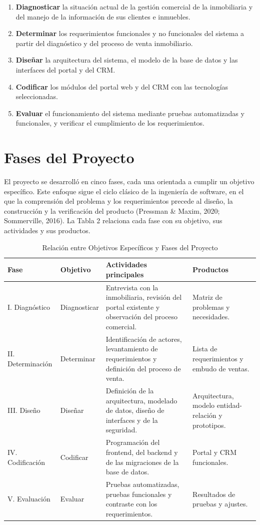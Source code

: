 \documentclass[stu,12pt,letterpaper,donotrepeattitle,floatsintext]{apa7}
\begin{document}
\begin{enumerate}[label=\arabic*.]
  \item \textbf{Diagnosticar} la situación actual de la gestión comercial de la inmobiliaria y del manejo de la información de sus clientes e inmuebles.
  \item \textbf{Determinar} los requerimientos funcionales y no funcionales del sistema a partir del diagnóstico y del proceso de venta inmobiliario.
  \item \textbf{Diseñar} la arquitectura del sistema, el modelo de la base de datos y las interfaces del portal y del CRM.
  \item \textbf{Codificar} los módulos del portal web y del CRM con las tecnologías seleccionadas.
  \item \textbf{Evaluar} el funcionamiento del sistema mediante pruebas automatizadas y funcionales, y verificar el cumplimiento de los requerimientos.
\end{enumerate}

\section{Fases del Proyecto}

El proyecto se desarrolló en cinco fases, cada una orientada a cumplir un objetivo específico. Este enfoque sigue el ciclo clásico de la ingeniería de software, en el que la comprensión del problema y los requerimientos precede al diseño, la construcción y la verificación del producto (Pressman \& Maxim, 2020; Sommerville, 2016). La Tabla 2 relaciona cada fase con su objetivo, sus actividades y sus productos.

\begin{table}[htbp]
\caption{Relación entre Objetivos Específicos y Fases del Proyecto}
\small
\begin{tabularx}{\linewidth}{>{\hsize}L>{\hsize}L>{\hsize}L>{\hsize}L}
\toprule
\textbf{Fase} & \textbf{Objetivo} & \textbf{Actividades principales} & \textbf{Productos} \\
\midrule
I. Diagnóstico & Diagnosticar & Entrevista con la inmobiliaria, revisión del portal existente y observación del proceso comercial. & Matriz de problemas y necesidades. \\
II. Determinación & Determinar & Identificación de actores, levantamiento de requerimientos y definición del proceso de venta. & Lista de requerimientos y embudo de ventas. \\
III. Diseño & Diseñar & Definición de la arquitectura, modelado de datos, diseño de interfaces y de la seguridad. & Arquitectura, modelo entidad-relación y prototipos. \\
IV. Codificación & Codificar & Programación del frontend, del backend y de las migraciones de la base de datos. & Portal y CRM funcionales. \\
V. Evaluación & Evaluar & Pruebas automatizadas, pruebas funcionales y contraste con los requerimientos. & Resultados de pruebas y ajustes. \\
\bottomrule
\end{tabularx}
\end{table}
\end{document}
